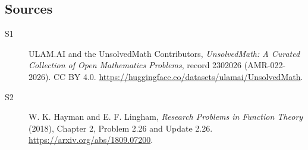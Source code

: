 \documentclass[11pt]{article}
\begin{document}
\subsection{Sources}
\begin{description}
\item[\hypertarget{source:2302026:1}{S1}] ULAM.AI and the UnsolvedMath Contributors, \emph{UnsolvedMath: A Curated Collection of Open Mathematics Problems}, record 2302026 (AMR-022-2026). CC BY 4.0. \url{https://huggingface.co/datasets/ulamai/UnsolvedMath}.
\item[\hypertarget{source:2302026:2}{S2}] W. K. Hayman and E. F. Lingham, \emph{Research Problems in Function Theory} (2018), Chapter 2, Problem 2.26 and Update 2.26. \url{https://arxiv.org/abs/1809.07200}.
\end{description}
\label{end:2302026}
\end{document}
